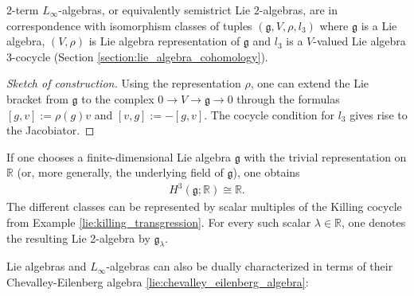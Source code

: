    \begin{property}
        2-term $L_\infty$-algebras, or equivalently semistrict Lie $2$-algebras, are in correspondence with isomorphism classes of tuples $(\mathfrak{g},V,\rho,l_3)$ where $\mathfrak{g}$ is a Lie algebra, $(V,\rho)$ is Lie algebra representation of $\mathfrak{g}$ and $l_3$ is a $V$-valued Lie algebra 3-cocycle (Section \ref{section:lie_algebra_cohomology}).

        \begin{proof}[Sketch of construction]
            Using the representation $\rho$, one can extend the Lie bracket from $\mathfrak{g}$ to the complex $0\rightarrow V\rightarrow\mathfrak{g}\rightarrow0$ through the formulas $[g,v]:=\rho(g)v$ and $[v,g] := -[g,v]$. The cocycle condition for $l_3$ gives rise to the Jacobiator.
        \end{proof}
    \end{property}
    \begin{example}\label{hda:gk_lie_2_algebra}
        If one chooses a finite-dimensional Lie algebra $\mathfrak{g}$ with the trivial representation on $\mathbb{R}$ (or, more generally, the underlying field of $\mathfrak{g}$), one obtains
        \begin{gather}
            H^3(\mathfrak{g};\mathbb{R})\cong\mathbb{R}.
        \end{gather}
        The different classes can be represented by scalar multiples of the Killing cocycle from Example \ref{lie:killing_transgression}. For every such scalar $\lambda\in\mathbb{R}$, one denotes the resulting Lie 2-algebra by $\mathfrak{g}_\lambda$.
    \end{example}

    Lie algebras and $L_\infty$-algebras can also be dually characterized in terms of their Chevalley-Eilenberg algebra \ref{lie:chevalley_eilenberg_algebra}:

